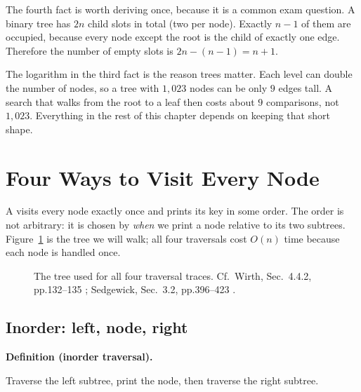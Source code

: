 \documentclass[11pt]{article}
\theoremstyle{definition}
\newenvironment{definitionbox}[1]{%
  \par\noindent\textbf{Definition (#1).}\ \itshape
}{\par\vspace{0.3em}}
\begin{document}
The fourth fact is worth deriving once, because it is a common exam
question. A binary tree has $2n$ child slots in total (two per node). Exactly
$n-1$ of them are occupied, because every node except the root is the child
of exactly one edge. Therefore the number of empty slots is
$2n-(n-1)=n+1$.

The logarithm in the third fact is the reason trees matter. Each level can
double the number of nodes, so a tree with $1{,}023$ nodes can be only $9$
edges tall. A search that walks from the root to a leaf then costs about $9$
comparisons, not $1{,}023$. Everything in the rest of this chapter depends on
keeping that short shape.

\section{Four Ways to Visit Every Node}

A  visits every node exactly once and prints its key in some
order. The order is not arbitrary: it is chosen by \emph{when} we print a
node relative to its two subtrees. Figure~\ref{fig:walk} is the tree we will
walk; all four traversals cost $O(n)$ time because each node is handled once.

\begin{figure}[h]
  \centering
  \caption{The tree used for all four traversal traces. Cf.\ Wirth,
    Sec.~4.4.2, pp.132--135 \cite{Wirth2004_algorithms_data_structures};
    Sedgewick, Sec.~3.2, pp.396--423 \cite{Sedgewick2011_algorithms}.}
  \label{fig:walk}
\end{figure}

\subsection{Inorder: left, node, right}

\begin{definitionbox}{inorder traversal}
Traverse the left subtree, print the node, then traverse the right subtree.
\end{definitionbox}
\end{document}
